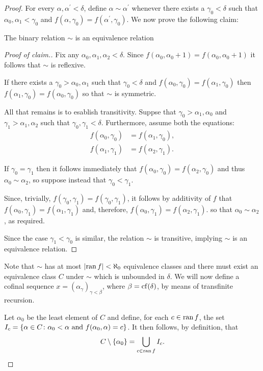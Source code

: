 \begin{proof}
	For every $\alpha,\alpha^\prime<\delta$, define $\alpha\sim\alpha^\prime$ whenever there exists a $\gamma_0<\delta$ such that $\alpha_0,\alpha_1<\gamma_0$ and $f(\alpha,\gamma_0)=f(\alpha^\prime,\gamma_0)$.  We now prove the following claim:
	\begin{claim}
		The binary relation $\sim$ is an equivalence relation
	\end{claim}
	\begin{proof}[Proof of claim.]
		Fix any $\alpha_0,\alpha_1,\alpha_2<\delta$.  Since $f(\alpha_0,\alpha_0+1)=f(\alpha_0,\alpha_0+1)$ it follows that $\sim$ is reflexive.

		If there exists a $\gamma_0>\alpha_0,\alpha_1$ such that $\gamma_0<\delta$ and $f(\alpha_0,\gamma_0)=f(\alpha_1,\gamma_0)$ then $f(\alpha_1,\gamma_0)=f(\alpha_0,\gamma_0)$ so that $\sim$ is symmetric.

		All that remains is to esablish transitivity.
		Suppse that $\gamma_0>\alpha_1,\alpha_0$ and $\gamma_1>\alpha_1,\alpha_2$
		such that $\gamma_0,\gamma_1<\delta$.  Furthermore, assume both the
		equations:
		\begin{align}
			f(\alpha_0,\gamma_0) & =f(\alpha_1,\gamma_0), \\
			f(\alpha_1,\gamma_1) & =f(\alpha_2,\gamma_1).
		\end{align}

		If $\gamma_0=\gamma_1$ then it follows immediately that
		$f(\alpha_0,\gamma_0)=f(\alpha_2,\gamma_0)$ and thus
		$\alpha_0\sim\alpha_2$, so suppose instead that $\gamma_0<\gamma_1$.

		Since, trivially, $f(\gamma_0,\gamma_1)=f(\gamma_0,\gamma_1)$, it
		follows by additivity of $f$ that
		$f(\alpha_0,\gamma_1)=f(\alpha_1,\gamma_1)$ and, therefore,
		$f(\alpha_0,\gamma_1)=f(\alpha_2,\gamma_1)$. so that
		$\alpha_0\sim\alpha_2$, as required.\noqed

		Since the case $\gamma_1<\gamma_0$ is similar, the relation $\sim$ is
		transitive, implying $\sim$ is an equivalence relation.
	\end{proof}

	Note that $\sim$ has at most $\left\lvert\operatorname{ran} f\right\rvert<\aleph_0$ equivalence classes
	and there must exist an equivalence class $C$ under $\sim$ which is
	unbounded in $\delta$.  We will now define a cofinal sequence
	$x=(\alpha_{\gamma})_{\gamma<\beta}$, where $\beta=\operatorname{cf}(\delta)$, by means
	of transfinite recursion.

	Let $\alpha_0$ be the least element of $C$ and define, for each $c\in\operatorname{ran}
		f$, the set $I_c=\left\lbrace \alpha\in C\colon \alpha_0<\alpha\text{ and
			}f(\alpha_0,\alpha)=c \right\rbrace$.  It then follows, by definition, that
	\begin{equation}
		C\setminus\left\lbrace \alpha_0\right\rbrace=\bigcup_{c\in\operatorname{ran} f}I_c.
	\end{equation}


\end{proof}
